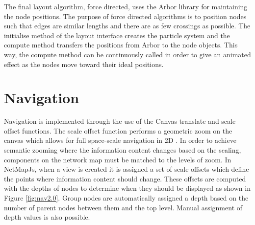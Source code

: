 \documentclass[11pt, a4paper]{report}
\begin{document}
The final layout algorithm, force directed, uses the Arbor library for
maintaining the node positions. The purpose of force directed algorithms is to
position nodes such that edges are similar lengths and there are as few
crossings as possible.  The initialise method of the layout interface creates
the particle system and the compute method transfers the positions from Arbor to
the node objects. This way, the compute method can be continuously called in
order to give an animated effect as the nodes move toward their ideal positions.

\section{Navigation}
\label{sec:navigation.impl}

Navigation is implemented through the use of the Canvas translate and scale
offset functions. The scale offset function performs a geometric zoom on the
canvas which allows for full space-scale navigation in 2D \cite{Furnas_1995}. In
order to achieve semantic zooming where the information content changes based on
the scaling, components on the network map must be matched to the levels of
zoom. In NetMapJs, when a view is created it is assigned a set of scale offsets
which define the points where information content should change. These offsets
are computed with the depths of nodes to determine when they should be displayed
as shown in Figure \ref{fig:nav2.0}. Group nodes are automatically assigned a
depth based on the number of parent nodes between them and the top level.
Manual assignment of depth values is also possible. 
\end{document}
